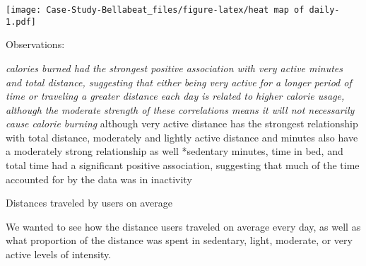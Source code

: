 \documentclass[
]{article}
\begin{document}
\texttt{[image: Case-Study-Bellabeat\_files/figure-latex/heat map of daily-1.pdf]}

Observations:

\emph{calories burned had the strongest positive association with very
active minutes and total distance, suggesting that either being very
active for a longer period of time or traveling a greater distance each
day is related to higher calorie usage, although the moderate strength
of these correlations means it will not necessarily cause calorie
burning }although very active distance has the strongest relationship
with total distance, moderately and lightly active distance and minutes
also have a moderately strong relationship as well *sedentary minutes,
time in bed, and total time had a significant positive association,
suggesting that much of the time accounted for by the data was in
inactivity

Distances traveled by users on average

We wanted to see how the distance users traveled on average every day,
as well as what proportion of the distance was spent in sedentary,
light, moderate, or very active levels of intensity.
\end{document}
